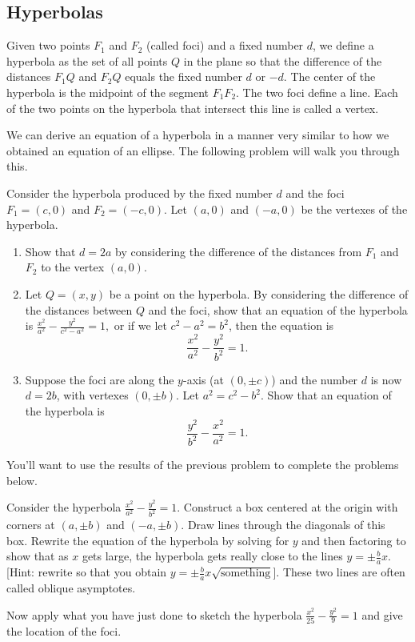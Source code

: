 \subsection{Hyperbolas}

\begin{definition}
Given two points $F_1$ and $F_2$ (called foci) and a fixed number $d$, we define a hyperbola as the set of all points $Q$ in the plane so that the difference of the distances $F_1Q$  and $F_2Q$ equals the fixed number $d$ or $-d$. The center of the hyperbola is the midpoint of the segment $F_1F_2$. The two foci define a line.  Each of the two points on the hyperbola that intersect this line is called a vertex.
\end{definition}

We can derive an equation of a hyperbola in a manner very similar to how we obtained an equation of an ellipse. The following problem will walk you through this.  

\begin{problem*}[Optional]
Consider the hyperbola produced by the fixed number $d$ and the foci $F_1=(c,0)$ and $F_2=(-c,0)$. Let $(a,0)$ and $(-a,0)$ be the vertexes of the hyperbola.
\begin{enumerate}
\item Show that $d=2a$ by considering the difference of the distances from $F_1$ and $F_2$ to the vertex $(a,0)$.
\item Let $Q=(x,y)$ be a point on the hyperbola. By considering the difference of the distances between $Q$ and the foci, show that an equation of the hyperbola is $\frac{x^2}{a^2}-\frac{y^2}{c^2-a^2}=1,$ or if we let $c^2-a^2=b^2$, then the equation is 
$$\frac{x^2}{a^2}-\frac{y^2}{b^2}=1.$$
\item Suppose the foci are along the $y$-axis (at $(0,\pm c)$) and the number $d$ is now $d=2b$, with vertexes $(0,\pm b)$. Let $a^2=c^2-b^2$. Show that an equation of the hyperbola is $$\frac{y^2}{b^2}-\frac{x^2}{a^2}=1.$$
\end{enumerate}
\end{problem*}

You'll want to use the results of the previous problem to complete the problems below.

\begin{problem} 
%
Consider the hyperbola $\frac{x^2}{a^2}-\frac{y^2}{b^2}=1.$ Construct a box centered at the origin with corners at $(a, \pm b)$ and $(-a,\pm b)$.  Draw lines through the diagonals of this box. Rewrite the equation of the hyperbola by solving for $y$ and then factoring to show that as $x$ gets large, the hyperbola gets really close to the lines $y=\pm \frac{b}{a}x$. [Hint:  rewrite so that you obtain $y=\pm\frac{b}{a}x\sqrt{\text{something}}$]. These two lines are often called oblique asymptotes. 

Now apply what you have just done to sketch the hyperbola $\frac{x^2}{25}-\frac{y^2}{9}=1$ and give the location of the foci. 
\end{problem}

